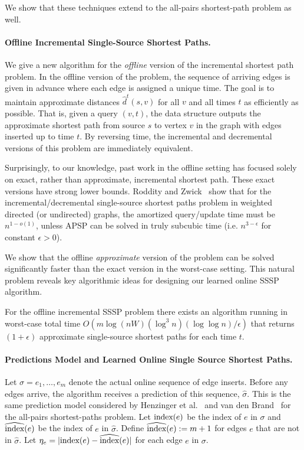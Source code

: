 We show that these techniques extend to the all-pairs shortest-path problem as well. 

\paragraph{Offline Incremental Single-Source Shortest Paths.}  We give a new algorithm for the \emph{offline} version of the incremental shortest path problem. In the offline version of the problem, the sequence of arriving edges is given in advance where each edge is assigned a unique time.  The goal is to maintain approximate distances $\hat{d}^t(s,v)$ for all $v$ and all times $t$ as efficiently as possible.  That is, given a query $(v,t)$, the data
structure outputs the approximate shortest path from source $s$ to
vertex $v$ in the graph with edges inserted up to time $t$.
By reversing time, the incremental and decremental versions of this problem are immediately equivalent.

Surprisingly, to our knowledge, past work in the offline setting has focused solely on exact, rather than approximate, incremental shortest path.  These exact versions have strong lower bounds. Roddity and Zwick~\cite{RodittyZ11} show that for the incremental/decremental single-source shortest paths problem in weighted directed (or undirected) graphs, the amortized query/update time must be $n^{1-o(1)}$, unless APSP can be solved in truly subcubic time (i.e. $n^{3-\epsilon}$ for constant $\epsilon>0$). 

We show that the offline \emph{approximate} version of the problem can be solved significantly faster than the exact version in the worst-case setting.  This natural problem reveals key algorithmic ideas for designing our learned online SSSP algorithm.

\begin{theorem}
\label{thm:offline-approx}
For the offline incremental SSSP problem there exists an algorithm running in worst-case total time $O(m \log (nW)  (\log^3 n)(\log \log n)/\epsilon)$ that returns $(1+\epsilon)$ approximate single-source shortest paths for each time $t$.
\end{theorem}


\paragraph{Predictions Model and Learned Online Single Source Shortest Paths.} 
Let $\sigma = e_1, \ldots, e_m$ denote the actual online sequence of edge inserts.  Before any edges arrive, the algorithm receives a prediction of this sequence, $\hat{\sigma}$.  This is the same prediction model considered by Henzinger et al.~\cite{HenzingerSSY24} and van den Brand~\cite{BrandFNP24} for the all-pairs shortest-paths problem. Let $\text{index}(e)$ be the index of $e$ in $\sigma$ and $\widehat{\text{index}}(e)$ be the index of $e$ in $\hat{\sigma}$.
Define $\widehat{\text{index}}(e):=m+1$ for edges $e$ that are not in $\hat{\sigma}$. 
Let $\eta_e = |\text{index}(e) - \widehat{\text{index}}(e)|$ for each edge $e$ in $\sigma$.

